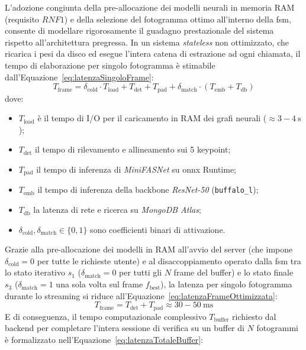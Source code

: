 L'adozione congiunta della pre-allocazione dei modelli neurali in memoria RAM (requisito $RNF1$) e della selezione del fotogramma ottimo all'interno della \gls{fsm}, consente di modellare rigorosamente il guadagno prestazionale del sistema rispetto all'architettura pregressa.
In un sistema \textit{stateless} non ottimizzato, che ricarica i pesi da disco ed esegue l'intera catena di estrazione ad ogni chiamata, il tempo di elaborazione per singolo fotogramma è stimabile dall'Equazione~\eqref{eq:latenzaSingoloFrame}:
\begin{equation}
    \label{eq:latenzaSingoloFrame}
    T_{\text{frame}} = \delta_{\text{cold}} \cdot T_{\text{load}} + T_{\text{det}} + T_{\text{pad}} + \delta_{\text{match}} \cdot (T_{\text{emb}} + T_{\text{db}})
\end{equation}
dove:
\begin{itemize}
    \item $T_{\text{load}}$ è il tempo di I/O per il caricamento in RAM dei grafi neurali ($\approx 3{-}4~\text{s}$);
    \item $T_{\text{det}}$ il tempo di rilevamento e allineamento sui 5 keypoint;
    \item $T_{\text{pad}}$ il tempo di inferenza di \textit{MiniFASNet} su \gls{onnx} Runtime;
    \item $T_{\text{emb}}$ il tempo di inferenza della backbone \textit{ResNet-50} (\texttt{buffalo\_l});
    \item $T_{\text{db}}$ la latenza di rete e ricerca su \textit{MongoDB Atlas};
    \item $\delta_{\text{cold}}, \delta_{\text{match}} \in \{0, 1\}$ sono coefficienti binari di attivazione. 
\end{itemize}
Grazie alla pre-allocazione dei modelli in RAM all'avvio del server (che impone $\delta_{\text{cold}} = 0$ per tutte le richieste utente) e al disaccoppiamento operato dalla \gls{fsm} tra lo stato iterativo $s_1$ ($\delta_{\text{match}} = 0$ per tutti gli $N$ frame del buffer) e lo stato finale $s_3$ ($\delta_{\text{match}} = 1$ una sola volta sul frame $f_{\text{best}}$), la latenza per singolo fotogramma durante lo streaming si riduce all'Equazione~\eqref{eq:latenzaFrameOttimizzata}:
\begin{equation}
    \label{eq:latenzaFrameOttimizzata}
    T_{\text{frame}} = T_{\text{det}} + T_{\text{pad}} \approx 30{-}50~\text{ms}
\end{equation}
E di conseguenza, il tempo computazionale complessivo $T_{\text{buffer}}$ richiesto dal backend per completare l'intera sessione di verifica su un buffer di $N$ fotogrammi è formalizzato nell'Equazione~\eqref{eq:latenzaTotaleBuffer}: 
